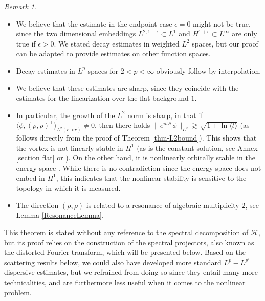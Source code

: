 \documentclass[11 pt]{amsart}
\theoremstyle{definition}
\theoremstyle{remark}
\newtheorem{rem}[thm]{Remark}
\numberwithin{equation}{section}
\newcommand{\dd}{\mathop{}\!\mathrm{d}}
\begin{document}
\begin{rem}

\begin{itemize}

\item We believe that the estimate in the endpoint case $\epsilon=0$ might not be true, since the two dimensional embeddings $L^{2,1+\epsilon}\subset L^1$ and $H^{1+\epsilon}\subset L^\infty$ are only true if $\epsilon>0$. We stated decay estimates in weighted $L^2$ spaces, but our proof can be adapted to provide estimates on other function spaces.

\item Decay estimates in $L^p$ spaces for $2<p<\infty$ obviously follow by interpolation.

\item We believe that these estimates are sharp, since they coincide with the estimates for the linearization over the flat background $1$.

\item In particular, the growth of the $L^2$ norm is sharp, in that if $\langle \phi,(\rho,\rho)^\top\rangle_{L^2(r\dd r)}\neq 0$, then there holds $\| e^{it \mathcal{H}} \phi \|_{L^2} \gtrsim \sqrt{1+\ln \langle t\rangle}$ (as follows directly from the proof of Theorem \ref{thm-L2bound}). This shows that the vortex is not linearly stable in $H^1$ (as is the constant solution, see Annex \ref{section flat} or \cite{Gerard_Cauchy2}). On the other hand, it is nonlinearly orbitally stable in the energy space \cite{GPS}. While there is no contradiction since the energy space does not embed in $H^1$, this indicates that the nonlinear stability is sensitive to the topology in which it is measured.

\item The direction $(\rho,\rho)$ is related to a resonance of algebraic multiplicity $2$, see Lemma \ref{ResonanceLemma}.
\end{itemize}
\end{rem}

This theorem is stated without any reference to the spectral decomposition of $\mathcal{H}$, but its proof relies on the construction of the spectral projectors, also known as the distorted Fourier transform, which will be presented below.
Based on the scattering results below, we could also have developed more standard $L^p - L^{p'}$ dispersive estimates, but we refrained from doing so since they entail many more technicalities, and are furthermore less useful when it comes to the nonlinear problem.
\end{document}
